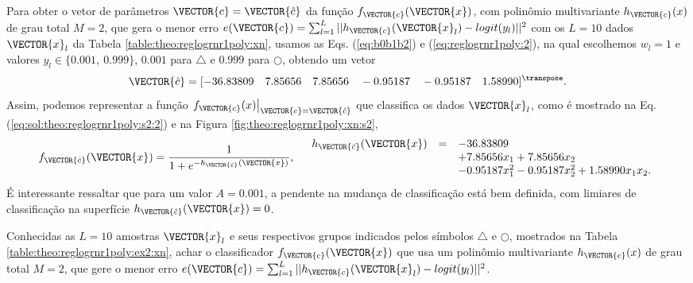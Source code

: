 \begin{SolutionT}\label{sol:theo:reglogrnr1poly:s2}
Para obter o vetor de parâmetros $\VECTOR{c}=\VECTOR{\hat{c}}$ da função $f_{\VECTOR{c}}(\VECTOR{x})$, 
com polinômio multivariante $h_{\VECTOR{c}}(x)$ de grau total $M=2$,
que gera o menor erro $e(\VECTOR{c}) =  \sum_{l=1}^{L} ||h_{\VECTOR{c}}(\VECTOR{x}_l)-logit(y_l)||^2$
com os $L=10$ dados $\VECTOR{x}_l$ da Tabela \ref{table:theo:reglogrnr1poly:xn},
usamos as Eqs. (\ref{eq:b0b1b2}) e  (\ref{eq:reglogrnr1poly:2}), 
na qual escolhemos $w_l=1$ e valores $y_l \in \{0.001,~ 0.999\}$,
$0.001$ para $\bigtriangleup$ e $0.999$ para $\bigcirc$, 
obtendo um vetor 
\begin{equation}
\VECTOR{\hat{c}}=[-36.83809\quad 7.85656\quad 7.85656\quad -0.95187\quad -0.95187\quad 1.58990]^{\transpose}.                  
\end{equation}
Assim, podemos representar a função $\left.f_{\VECTOR{c}}(x)\right|_{\VECTOR{c}=\VECTOR{\hat{c}}}$ 
que classifica os dados $\VECTOR{x}_l$, 
como é mostrado na Eq. (\ref{eq:sol:theo:reglogrnr1poly:s2:2}) e na Figura \ref{fig:theo:reglogrnr1poly:xn:s2},
\begin{equation}\label{eq:sol:theo:reglogrnr1poly:s2:2}
f_{\VECTOR{\hat{c}}}(\VECTOR{x})= \frac{1}{1+e^{-h_{\VECTOR{\hat{c}}}(\VECTOR{x})}},
\quad
\begin{array}{lll}
h_{\VECTOR{\hat{c}}}(\VECTOR{x}) & = & -36.83809\\
                         ~ & ~ & +7.85656 x_1 +7.85656 x_2 \\
                         ~ & ~ & -0.95187 x_1^2 -0.95187  x_2^2 + 1.58990 x_1 x_2.\\
\end{array}
\end{equation}
É interessante ressaltar que para um valor $A=0.001$, a pendente na mudança de classificação está bem definida,
com limiares de classificação na superfície $h_{\VECTOR{\hat{c}}}(\VECTOR{x})=0$.
\end{SolutionT}


\begin{example}\label{ex2:theo:reglogrnr1poly}
Conhecidas as $L=10$ amostras $\VECTOR{x}_l$ e seus respectivos grupos indicados pelos símbolos $\bigtriangleup$ e $\bigcirc$, 
mostrados na Tabela \ref{table:theo:reglogrnr1poly:ex2:xn},
achar o classificador $f_{\VECTOR{c}}(\VECTOR{x})$ que usa um polinômio multivariante $h_{\VECTOR{c}}(x)$
de grau total $M=2$, 
que gere o menor erro $e(\VECTOR{c}) =  \sum_{l=1}^{L} ||h_{\VECTOR{c}}(\VECTOR{x}_l)-logit(y_l)||^2$.
\end{example}


